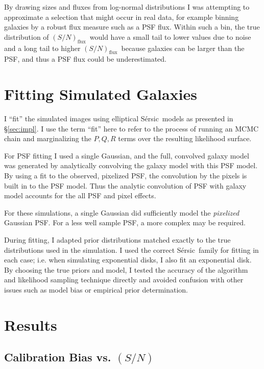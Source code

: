 \documentclass[12pt,preprint]{aastex}
\newcommand{\sn}{$(S/N)$}
\newcommand{\fsn}{$(S/N)_{\textrm{flux}}$}
\newcommand{\sersic}{S\'{e}rsic}
\begin{document}
By drawing sizes and fluxes from log-normal distributions I was attempting to
approximate a selection that might occur in real data, for example binning
galaxies by a robust flux measure such as a PSF flux.  Within such a bin, the
true distribution of \fsn\ would have a small tail to lower values due to noise
and a long tail to higher \fsn\ because galaxies can be larger than the
PSF, and thus a PSF flux could be underestimated.

\section{Fitting Simulated Galaxies} \label{sec:simfit}

I ``fit'' the simulated images using elliptical \sersic\ models as presented in
\S \ref{sec:impl}.   I use the term ``fit'' here to refer to the process of
running an MCMC chain and marginalizing the $P,Q,R$ terms over the resulting
likelihood surface.

For PSF fitting I used a single Gaussian, and the full, convolved galaxy model
was generated by analytically convolving the galaxy model with this PSF model.
By using a fit to the observed, pixelized PSF, the convolution by the pixels is
built in to the PSF model. Thus the analytic convolution of PSF with galaxy
model accounts for the all PSF and pixel effects.

For these simulations, a single Gaussian did sufficiently model the {\it
pixelized} Gaussian PSF. For a less well sample PSF, a more complex may be
required.

During fitting, I adapted prior distributions matched exactly to the true
distributions used in the simulation.  I used the correct \sersic\ family for
fitting in each case; i.e. when simulating exponential disks, I also fit an
exponential disk.  By choosing the true priors and model, I tested the accuracy
of the algorithm and likelihood sampling technique directly and avoided
confusion with other issues such as model bias or empirical prior
determination.

\section{Results} \label{sec:results}

\subsection{Calibration Bias vs. \sn} \label{sec:snbias}
\end{document}
